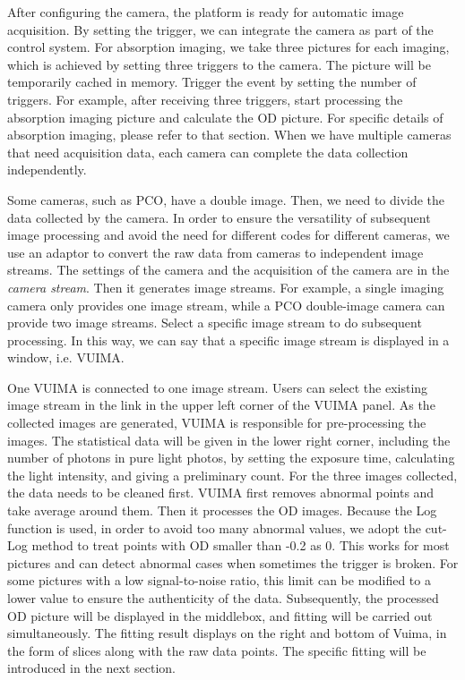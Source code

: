 After configuring the camera, the platform is ready for automatic image acquisition. By setting the trigger, we can integrate the camera as part of the control system. For absorption imaging, we take three pictures for each imaging, which is achieved by setting three triggers to the camera. The picture will be temporarily cached in memory. Trigger the event by setting the number of triggers. For example, after receiving three triggers, start processing the absorption imaging picture and calculate the OD picture. For specific details of absorption imaging, please refer to that section. When we have multiple cameras that need acquisition data, each camera can complete the data collection independently.

Some cameras, such as PCO, have a double image. Then, we need to divide the data collected by the camera. In order to ensure the versatility of subsequent image processing and avoid the need for different codes for different cameras, we use an adaptor to convert the raw data from cameras to independent image streams. The settings of the camera and the acquisition of the camera are in the \textit{camera stream}. Then it generates image streams. For example, a single imaging camera only provides one image stream, while a PCO double-image camera can provide two image streams. Select a specific image stream to do subsequent processing. In this way, we can say that a specific image stream is displayed in a window, i.e. VUIMA.

One VUIMA is connected to one image stream. Users can select the existing image stream in the link in the upper left corner of the VUIMA panel. As the collected images are generated, VUIMA is responsible for pre-processing the images. The statistical data will be given in the lower right corner, including the number of photons in pure light photos, by setting the exposure time, calculating the light intensity, and giving a preliminary count. For the three images collected, the data needs to be cleaned first. VUIMA first removes abnormal points and take average around them. Then it processes the OD images. Because the Log function is used, in order to avoid too many abnormal values, we adopt the cut-Log method to treat points with OD smaller than -0.2 as 0. This works for most pictures and can detect abnormal cases when sometimes the trigger is broken. For some pictures with a low signal-to-noise ratio, this limit can be modified to a lower value to ensure the authenticity of the data. Subsequently, the processed OD picture will be displayed in the middlebox, and fitting will be carried out simultaneously. The fitting result displays on the right and bottom of Vuima, in the form of slices along with the raw data points. The specific fitting will be introduced in the next section.

